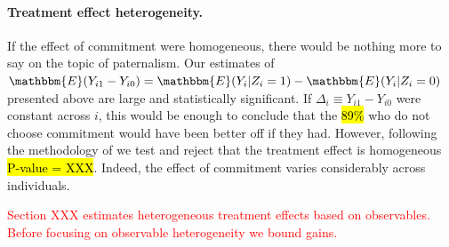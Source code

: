 \documentclass[oneside,11pt]{article}
\begin{document}
\paragraph{Treatment effect heterogeneity.} If the effect of commitment were homogeneous, there would be nothing more to say on the topic of paternalism. Our estimates of $\mathbbm{E}(Y_{i1} - Y_{i0}) = \mathbbm{E}(Y_i|Z_i=1) - \mathbbm{E}(Y_i|Z_i=0)$ presented above are large and statistically significant. If $\Delta_i \equiv Y_{i1} - Y_{i0}$ were constant across $i$, this would be enough to conclude that the \hl{89\%} who do not choose commitment would have been better off if they had. However, following the methodology of \cite{chernozhukov2018generic} we test and reject that the treatment effect is homogeneous \hl{P-value = XXX}. Indeed, the effect of commitment varies considerably across individuals. \textcolor{red}{Section XXX estimates heterogeneous treatment effects based on observables. Before focusing on observable heterogeneity we bound gains.

}
\end{document}
